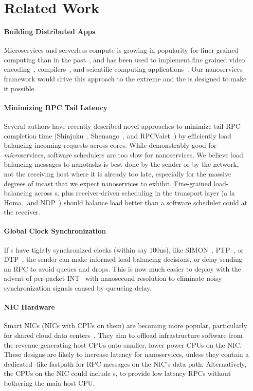 \section{Related Work}

\paragraph{Building Distributed Apps}
Microservices and serverless compute is growing in popularity for finer-grained computing than in the past~\cite{aws-lambda, gcloud-functions, azure-functions}, and has been used to implement fine grained video encoding~\cite{ExCamera}, compilers~\cite{gg}, and scientific computing applications~\cite{PyWren}.
Our nanoservices framework would drive this approach to the extreme and the \name{} is designed to make it possible.

\paragraph{Minimizing RPC Tail Latency}
Several authors have recently described novel approaches to minimize tail RPC completion time (Shinjuku~\cite{shinjuku}, Shenango~\cite{shenango}, and RPCValet~\cite{rpcvalet}) by efficiently load balancing incoming requests across cores. While demonstrably good for {\em micro}services, software schedulers are too slow for nanoservices. We believe load balancing messages to nanotasks is best done by the sender or by the network, not the receiving host where it is already too late, especially for the massive degrees of incast that we expect nanoservices to exhibit. Fine-grained load-balancing across \name{}s, plus receiver-driven scheduling in the transport layer (a la Homa~\cite{homa} and NDP~\cite{ndp}) should balance load better than a software scheduler could at the receiver. 

\paragraph{Global Clock Synchronization} If \name{}s have tightly synchronized clocks (within say 100ns), like SIMON~\cite{10.5555/3323234.3323280}, PTP~\cite{rfc8173}, or DTP~\cite{dtp}, the sender can make informed load balancing decisions, or delay sending an RPC to avoid queues and drops. This is now much easier to deploy with the advent of per-packet INT~\cite{INT} with nanosecond resolution to eliminate noisy synchronization signals caused by queueing delay.  

\paragraph{NIC Hardware}
Smart NICs (NICs with CPUs on them) are becoming more popular, particularly for shared cloud data centers~\cite{nitro, bluefield, pensando}. They aim to offload infrastructure software from the revenue-generating host CPUs onto smaller, lower power CPUs on the NIC. These designs are likely to increase latency for nanoservices, unless they contain a dedicated \name{}-like fastpath for RPC messages on the NIC's data path. Alternatively, the CPUs on the NIC could include \name{}s, to provide low latency RPCs without bothering the main host CPU. 

